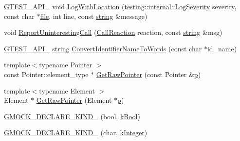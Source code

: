 \begin{DoxyCompactItemize}
\item 
\hyperlink{gtest-port_8h_aa73be6f0ba4a7456180a94904ce17790}{G\+T\+E\+S\+T\+\_\+\+A\+P\+I\+\_\+} void \hyperlink{namespacetesting_1_1internal_af271cd1fc0b62a7f4736cb3109e86a37}{Log\+With\+Location} (\hyperlink{namespacetesting_1_1internal_a203d1a8a2147a53d12bbdae40d443914}{testing\+::internal\+::\+Log\+Severity} severity, const char $\ast$\hyperlink{_07copy_08_2_read_camera_model_8m_a151631b2fd2bb776ef06c9f440a7ed74}{file}, int line, const \hyperlink{namespacetesting_1_1internal_a8e8ff5b11e64078831112677156cb111}{string} \&message)
\item 
void \hyperlink{namespacetesting_1_1internal_a8d99a1e87d0cea563b2bfad8a4e65276}{Report\+Uninteresting\+Call} (\hyperlink{namespacetesting_1_1internal_adfcd859062983a889f4bd18e6977357e}{Call\+Reaction} reaction, const \hyperlink{namespacetesting_1_1internal_a8e8ff5b11e64078831112677156cb111}{string} \&msg)
\item 
\hyperlink{gtest-port_8h_aa73be6f0ba4a7456180a94904ce17790}{G\+T\+E\+S\+T\+\_\+\+A\+P\+I\+\_\+} \hyperlink{namespacetesting_1_1internal_a8e8ff5b11e64078831112677156cb111}{string} \hyperlink{namespacetesting_1_1internal_a571db854f6de337007c53573c9cbf8a3}{Convert\+Identifier\+Name\+To\+Words} (const char $\ast$id\+\_\+name)
\item 
{\footnotesize template$<$typename Pointer $>$ }\\const Pointer\+::element\+\_\+type $\ast$ \hyperlink{namespacetesting_1_1internal_ae88d1a6f95165c43c27a6c0e2d357e61}{Get\+Raw\+Pointer} (const Pointer \&\hyperlink{jquery_8js_a2335e57f79b6acfb6de59c235dc8a83e}{p})
\item 
{\footnotesize template$<$typename Element $>$ }\\Element $\ast$ \hyperlink{namespacetesting_1_1internal_a4d17b114b61b805ac5f37e9c26e29e55}{Get\+Raw\+Pointer} (Element $\ast$\hyperlink{jquery_8js_a2335e57f79b6acfb6de59c235dc8a83e}{p})
\item 
\hyperlink{namespacetesting_1_1internal_a20f5584732e44a368e7acf295b639319}{G\+M\+O\+C\+K\+\_\+\+D\+E\+C\+L\+A\+R\+E\+\_\+\+K\+I\+N\+D\+\_\+} (bool, \hyperlink{namespacetesting_1_1internal_aa8747bda20137c9aa7f846dee830e686a3af2191917fb1796599139b3615302fe}{k\+Bool})
\item 
\hyperlink{namespacetesting_1_1internal_ac8f3722ca21d8b14f86e5c949e843508}{G\+M\+O\+C\+K\+\_\+\+D\+E\+C\+L\+A\+R\+E\+\_\+\+K\+I\+N\+D\+\_\+} (char, \hyperlink{namespacetesting_1_1internal_aa8747bda20137c9aa7f846dee830e686a8a52f0fd73e05da35c45d80653633cab}{k\+Integer})

\end{DoxyCompactItemize}
